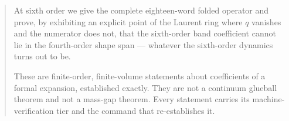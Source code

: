 \begin{abstract}
At sixth order we give the complete eighteen-word folded operator and
prove, by exhibiting an explicit point of the Laurent ring where $q$
vanishes and the numerator does not, that the sixth-order band
coefficient cannot lie in the fourth-order shape span --- whatever the
sixth-order dynamics turns out to be.

These are finite-order, finite-volume statements about coefficients of a
formal expansion, established exactly. They are not a continuum
glueball theorem and not a mass-gap theorem. Every statement carries its
machine-verification tier and the command that re-establishes it.
\end{abstract}
